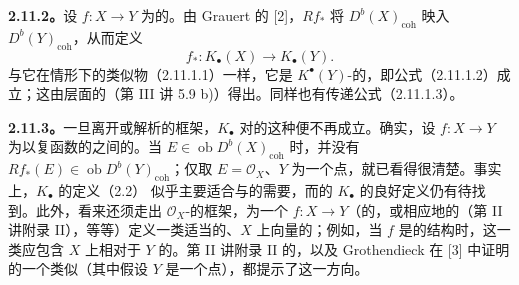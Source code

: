 \textbf{2.11.2。}设 $f:X\to Y$ 为的。由 Grauert 的 [2]，$Rf_*$ 将 $D^b(X)_{\mathrm{coh}}$ 映入 $D^b(Y)_{\mathrm{coh}}$，从而定义
\[f_*:K_\bullet(X)\longrightarrow K_\bullet(Y).\tag{2.11.2.1}\]
与它在情形下的类似物（2.11.1.1）一样，它是 $K^\bullet(Y)$-的，即公式（2.11.1.2）成立；这由层面的（第 III 讲 5.9 b)）得出。同样也有传递公式（2.11.1.3）。

\textbf{2.11.3。}一旦离开或解析的框架，$K_\bullet$ 对的这种便不再成立。确实，设 $f:X\to Y$ 为以复函数的之间的。当 $E\in\operatorname{ob}D^b(X)_{\mathrm{coh}}$ 时，并没有 $Rf_*(E)\in\operatorname{ob}D^b(Y)_{\mathrm{coh}}$；仅取 $E=\mathscr O_X$、$Y$ 为一个点，就已看得很清楚。事实上，$K_\bullet$ 的定义（2.2）
似乎主要适合与的需要，而的 $K_\bullet$ 的良好定义仍有待找到。此外，看来还须走出 $\mathscr O_X$-的框架，为一个 $f:X\to Y$（的，或相应地的（第 II 讲附录 II），等等）定义一类适当的、$X$ 上向量的；例如，当 $f$ 是的结构时，这一类应包含 $X$ 上相对于 $Y$ 的。第 II 讲附录 II 的，以及 Grothendieck 在 [3] 中证明的一个类似（其中假设 $Y$ 是一个点），都提示了这一方向。

